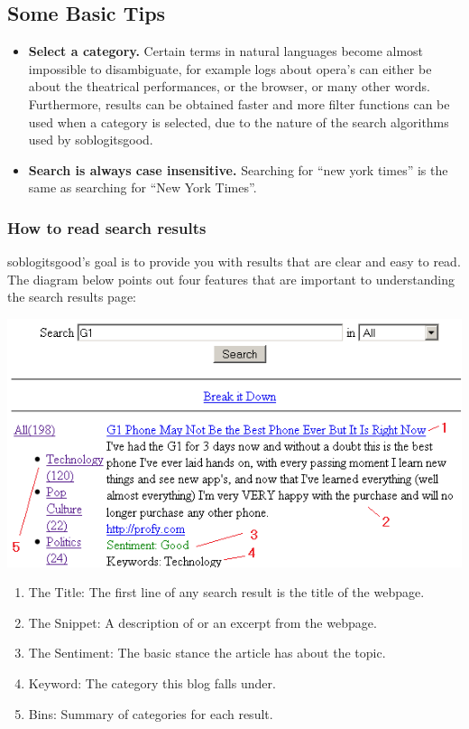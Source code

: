 \documentclass[titlepage]{article}
\begin{document}
\subsection{Some Basic Tips}
\begin{itemize}
\item \textbf{Select a category.} Certain terms in natural languages become
almost impossible to disambiguate, for example logs about opera's can either
be about the theatrical performances, or the browser, or many other words.
Furthermore, results can be obtained faster and more filter functions can be
used when a category is selected, due to the nature of the search algorithms
used by \textsf{soblogitsgood}.
\item \textbf{Search is always case insensitive.} Searching for “new york times” is the
same as searching for “New York Times”.
\end{itemize}

\subsubsection{How to read search results}
\textsf{soblogitsgood}'s goal is to provide you with results that are clear and easy to
read. The diagram below points out four features that are important to
understanding the search results page:
\begin{center}
\includegraphics{results.png}
\end{center}

\begin{enumerate}
\item The Title: The first line of any search result is the title of the
webpage.
\item The Snippet: A description of or an excerpt from the webpage.
\item The Sentiment: The basic stance the article has about the topic.
\item Keyword: The category this blog falls under.
\item Bins: Summary of categories for each result.
\end{enumerate}
\end{document}
